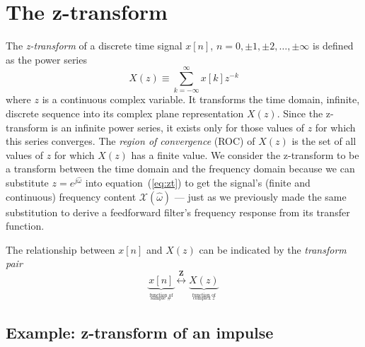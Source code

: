\section{The z-transform}
The \emph{z-transform} of a discrete time signal $x[n]$, $n=0, \pm 1,
\pm 2, \ldots, \pm\infty$ is defined as the power series
\begin{equation}
X(z) \equiv \sum_{k=-\infty}^{\infty} x[k] z^{-k}
\label{eq:zt}
\end{equation}
where $z$ is a continuous complex variable. It transforms the time
domain, infinite, discrete sequence into its complex plane
representation $X(z)$. Since the z-transform is an infinite power
series, it exists only for those values of $z$ for which this series
converges. The \emph{region of convergence} (ROC) of $X(z)$ is the set
of all values of $z$ for which $X(z)$ has a finite value. We consider
the z-transform to be a transform between the time domain and the
frequency domain because we can substitute $z=e^{j\hat{\omega}}$ into
equation~(\ref{eq:zt}) to get the signal's (finite and continuous)
frequency content $\mathcal{X}(\hat{\omega})$ --- just as we
previously made the same substitution to derive a feedforward filter's
frequency response from its transfer function.

The relationship between $x[n]$ and $X(z)$ can be indicated
by the \emph{transform pair}
\begin{equation}
\underbrace{x[n]}_{\stackrel{\text{function of}}{_\text{sample \#}}}
   \stackrel{\mathbf{Z}}{\longleftrightarrow} 
   \underbrace{X(z)}_{\stackrel{\text{function of}}{_\text{complex $z$}}}
\end{equation}


\subsection{Example: z-transform of an impulse}


